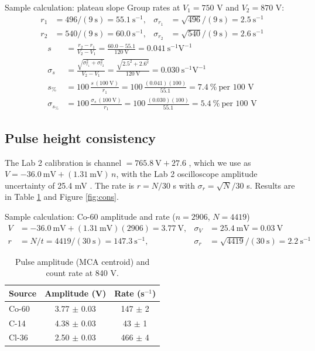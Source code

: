 \documentclass[12pt]{article}
\begin{document}
\begin{samplecalc}{Sample calculation: plateau slope}
Group rates at $V_1 = 750$ V and $V_2 = 870$ V:
\begin{align*}
r_1 &= 496/(9\ \text{s}) = 55.1\ \text{s}^{-1}, &
\sigma_{r_1} &= \sqrt{496}/(9\ \text{s}) = 2.5\ \text{s}^{-1}\\
r_2 &= 540/(9\ \text{s}) = 60.0\ \text{s}^{-1}, &
\sigma_{r_2} &= \sqrt{540}/(9\ \text{s}) = 2.6\ \text{s}^{-1}
\end{align*}
\begin{align*}
s &= \frac{r_2 - r_1}{V_2 - V_1} = \frac{60.0 - 55.1}{120\ \text{V}} = 0.041\ \text{s}^{-1}\text{V}^{-1}\\
\sigma_s &= \frac{\sqrt{\sigma_{r_1}^2 + \sigma_{r_2}^2}}{V_2 - V_1} = \frac{\sqrt{2.5^2 + 2.6^2}}{120\ \text{V}} = 0.030\ \text{s}^{-1}\text{V}^{-1}\\
s_{\%} &= 100\,\frac{s\,(100\ \text{V})}{r_1} = 100\,\frac{(0.041)(100)}{55.1} = 7.4\ \%\ \text{per 100 V}\\
\sigma_{s_{\%}} &= 100\,\frac{\sigma_s\,(100\ \text{V})}{r_1} = 100\,\frac{(0.030)(100)}{55.1} = 5.4\ \%\ \text{per 100 V}
\end{align*}
\end{samplecalc}

\subsection{Pulse height consistency}

The Lab 2 calibration is channel $= 765.8\ \text{V} + 27.6$ \cite{lab2}, which we use as $V = -36.0\ \text{mV} + (1.31\ \text{mV})\,n$, with the Lab 2 oscilloscope amplitude uncertainty of 25.4 mV \cite{lab2}. The rate is $r = N/30$ s with $\sigma_r = \sqrt{N}/30$ s. Results are in Table \ref{tab:cons} and Figure \ref{fig:cons}.

\begin{samplecalc}{Sample calculation: Co-60 amplitude and rate ($n = 2906$, $N = 4419$)}
\begin{align*}
V &= -36.0\ \text{mV} + (1.31\ \text{mV})(2906) = 3.77\ \text{V}, &
\sigma_V &= 25.4\ \text{mV} = 0.03\ \text{V}\\
r &= N/t = 4419/(30\ \text{s}) = 147.3\ \text{s}^{-1}, &
\sigma_r &= \sqrt{4419}/(30\ \text{s}) = 2.2\ \text{s}^{-1}
\end{align*}
\end{samplecalc}

\begin{table}[!htbp]
\centering\small
\begin{tabular}{lcc}
\toprule
\textbf{Source} & \textbf{Amplitude (V)} & \textbf{Rate (s$^{-1}$)} \\
\midrule
Co-60 & 3.77 $\pm$ 0.03 & 147 $\pm$ 2 \\
C-14 & 4.38 $\pm$ 0.03 & 43 $\pm$ 1 \\
Cl-36 & 2.50 $\pm$ 0.03 & 466 $\pm$ 4 \\
\bottomrule
\end{tabular}
\caption{Pulse amplitude (MCA centroid) and count rate at 840 V.}
\label{tab:cons}
\end{table}
\end{document}
